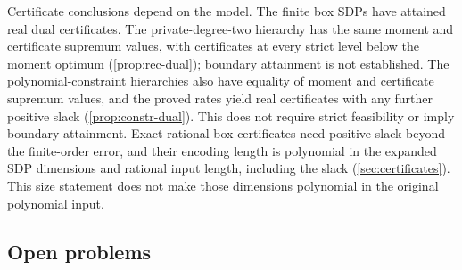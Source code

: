 Certificate conclusions depend on the model. The finite box SDPs have
attained real dual certificates. The private-degree-two hierarchy has the
same moment and certificate supremum values, with certificates at every
strict level below the moment optimum (\cref{prop:rec-dual}); boundary
attainment is not established. The polynomial-constraint hierarchies also
have equality of moment and certificate supremum values, and the proved
rates yield real certificates with any further positive slack
(\cref{prop:constr-dual}). This does not require strict feasibility or imply
boundary attainment. Exact rational box
certificates need positive slack beyond the finite-order error, and their
encoding length is polynomial in the expanded SDP dimensions and rational
input length, including the slack
(\cref{sec:certificates}). This size statement does not make those dimensions
polynomial in the original polynomial input.

\subsection{Open problems}

